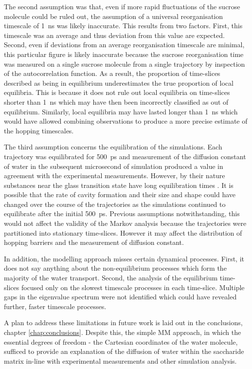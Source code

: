 The second assumption was that, even if more rapid fluctuations of the sucrose molecule could be ruled out, the assumption of a universal reorganisation timescale of \SI{1}{\nano\second} was likely inaccurate. This results from two factors. First, this timescale was an average and thus deviation from this value are expected.  Second, even if deviations from an average reorganisation timescale are minimal, this particular figure is likely inaccurate because the sucrose reorganisation time was measured on a single sucrose molecule from a single trajectory by inspection of the autocorrelation function.  As a result, the proportion of time-slices described as being in equilibrium underestimates the true proportion of local equilibria. This is because it does not rule out local equilibria on time-slices shorter than \SI{1}{\nano\second} which may have then been incorrectly classified as out of equilibrium. Similarly, local equilibria may have lasted longer than \SI{1}{\nano\second} which would have allowed combining observations to produce a more precise estimate of the hopping timescales. 

The third assumption concerns the equilibration of the simulations. Each trajectory was equilibrated for \SI{500}{\pico\second} and measurement of the diffusion constant of water in the subsequent microsecond of simulation produced a value in agreement with the experimental measurements.  However, by their nature substances near the glass transition state have long equilibration times \cite{Bones2012}. It is possible that the rate of cavity formation and their size and shape could have changed over the course of the trajectories as the simulations continued to equilibrate after the initial \SI{500}{\pico\second}. Previous assumptions notwithstanding, this would not affect the validity of the Markov analysis because the trajectories were partitioned into stationary time-slices. However it may affect the distribution of hopping barriers and the measurement of diffusion constant.  

In addition, the modelling approach misses certain dynamical processes.  First, it does not say anything about the non-equilibrium processes which form the majority of the water transport. Second, the analysis of the equilibrium time-slices focused only on the slowest timescale processes in each time-slice. Multiple gaps in the eigenvalue spectrum were not identified which could have revealed further, faster timescale processes.  

A plan to address these limitations in future work is laid out in the conclusions, chapter \ref{chap:conclusions}. Despite this, the simple MM approach, in which the essential degrees of freedom - the Cartesian coordinates of the water molecule, sufficed to provide an explanation of the diffusion of water within the saccharide matrix in-line with experimental measurements and other simulation analysis. 



